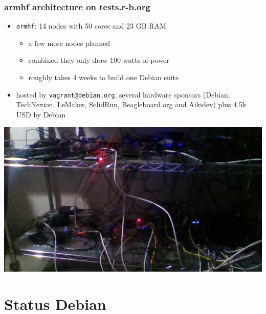 \documentclass[14pt,aspectratio=169]{beamer}
\begin{document}
\begin{frame}
 \frametitle{armhf architecture on tests.r-b.org}

 \begin{itemize}
  \item \texttt{armhf}: 14 nodes with 50 cores and 23 GB RAM
  \begin{itemize}
   \item a few more nodes planned
   \item combined they only draw 100 watts of power
   \item<2> roughly takes 4 weeks to build one Debian suite
  \end{itemize}
  \item \small{hosted by \texttt{vagrant@debian.org}, several hardware sponsors
  (Debian, TechNexion, LeMaker, SolidRun, Beagleboard.org and Aikidev)
  plus 4.5k USD by Debian}
\end{itemize}
 \begin{center}
  \includegraphics[height=0.42\paperheight]{images/2016-01-26-180836.jpg}
  \vfill
 \end{center}
\end{frame}

\section{Status Debian}
\end{document}
